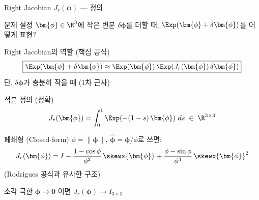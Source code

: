\begin{frame}[shrink=25]{Right Jacobian $J_r(\bm{\phi})$ --- 정의}
  \begin{block}{문제 설정}
    $\bm{\phi} \in \R^3$에 작은 변분 $\delta\bm{\phi}$를 더할 때, $\Exp(\bm{\phi}+\delta\bm{\phi})$를 어떻게 표현?
  \end{block}
  \begin{alertblock}{Right Jacobian의 역할 (핵심 공식)}
    \[
      \boxed{\Exp(\bm{\phi}+\delta\bm{\phi}) \approx \Exp(\bm{\phi})\,\Exp\!\left(J_r(\bm{\phi})\,\delta\bm{\phi}\right)}
    \]
    단, $\delta\bm{\phi}$가 충분히 작을 때 (1차 근사)
  \end{alertblock}
  \pause
  \begin{block}{적분 정의 (정확)}
    \[
      J_r(\bm{\phi}) = \int_0^1 \Exp\!\left(-(1-s)\,\bm{\phi}\right)\,ds \;\in\; \R^{3\times 3}
    \]
  \end{block}
  \pause
  \begin{block}{폐쇄형 (Closed-form)}
    $\phi = \|\bm{\phi}\|$, $\hat{\bm{\phi}} = \bm{\phi}/\phi$로 쓰면:
    \[
      J_r(\bm{\phi}) = I
        - \frac{1 - \cos\phi}{\phi^2}\,\skewx{\bm{\phi}}
        + \frac{\phi - \sin\phi}{\phi^3}\,\skewx{\bm{\phi}}^2
    \]
    (Rodrigues 공식과 유사한 구조)
  \end{block}
  \pause
  \begin{alertblock}{소각 극한}
    $\bm{\phi} \to \bm{0}$ 이면 $J_r(\bm{\phi}) \to I_{3\times 3}$
  \end{alertblock}
\end{frame}


